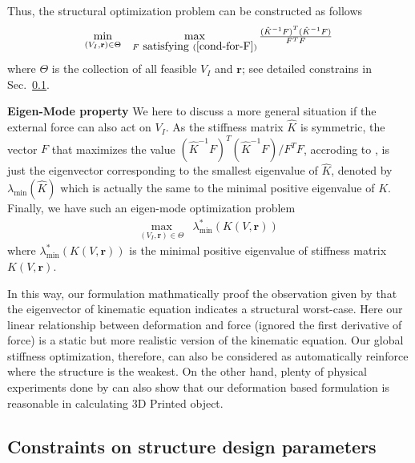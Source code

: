 Thus, the structural optimization problem can be constructed as follows
\begin{equation} \label{eq:min-max-deformation}
\begin{array}{ccl}
\min\limits_{(V_I, \mathbf{r})\in\Theta} &
\max\limits_{F \mbox{ satisfying }  (\ref{cond-for-F}) } \frac{{(\hat{K}^{-1}F)}^T(\hat{K}^{-1}F)}{{F}^TF}
\end{array}
\end{equation}
where $\Theta$ is the collection of all feasible $V_I$ and $\mathbf{r}$; see detailed constrains in Sec.~\ref{subsec:constraints_for_opimization}.

\noindent\textbf{Eigen-Mode property} We here to discuss a more general situation if the external force can also act on $V_I$. As the stiffness matrix $\hat{K}$ is symmetric, the vector $F$ that maximizes the value ${{(\hat{K}^{-1}F)}^T(\hat{K}^{-1}F)}/{F^TF}$, accroding to \cite{Parlett:1998}, is just the eigenvector corresponding to the smallest eigenvalue of $\hat{K}$, denoted by $\lambda_{\min} (\hat{K})$ which is actually the same to the minimal positive eigenvalue of $K$.
%
Finally, we have such an eigen-mode optimization problem
\begin{equation}
\label{eq:max-min-eigenvalue}
\begin{array}{cl}
\max\limits_{(V_I, \mathbf{r})\in\Theta} & \lambda_{\min}^{*}(K(V,\mathbf{r}))
\end{array}
\end{equation}
where $\lambda_{\min}^{*}(K(V,\mathbf{r}))$ is the minimal positive eigenvalue of stiffness matrix $K(V,\mathbf{r})$.	


In this way, our formulation mathmatically proof the observation given by \cite{zhou:2013} that the eigenvector of kinematic equation indicates a structural worst-case. Here our linear relationship between deformation and force (ignored the first derivative of force) is a static but more realistic version of the kinematic equation. Our global stiffness optimization, therefore, can also be considered as automatically reinforce where the structure is the weakest. On the other hand, plenty of physical experiments done by \cite{zhou:2013} can also show that our deformation based formulation is reasonable in calculating 3D Printed object.


\subsection{ Constraints on structure design parameters}
\label{subsec:constraints_for_opimization}




